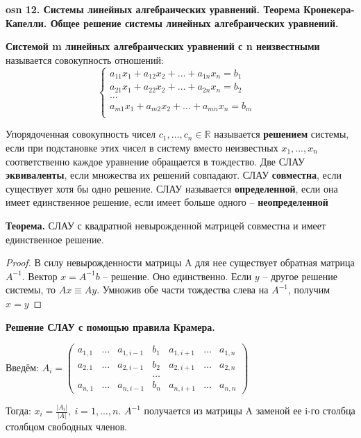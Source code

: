 \setcounter{section}{15}
\setcounter{subsection}{12}
\setcounter{equation}{0}
\textbf{\LARGE osn 12. Системы линейных алгебраических уравнений. Теорема Кронекера-Капелли. Общее решение системы линейных алгебраических уравнений.}

\textbf{Системой m линейных алгебраических уравнений с n неизвестными} называется совокупность отношений:
    $$\begin{cases}
        a_{11}x_1 + a_{12}x_2+\dots+a_{1n}x_n = b_1&\\
        a_{21}x_1 + a_{22}x_2+\dots+a_{2n}x_n = b_2&\\
        \dots&\\
        a_{m1}x_1 + a_{m2}x_2+\dots+a_{mn}x_n = b_m&\\
    \end{cases}$$
    
Упорядоченная совокупность чисел $c_1, ..., c_n \in\mathbb{R}$ называется \textbf{решением} системы, если при подстановке этих чисел в систему вместо неизвестных $x_1, ..., x_n$ соответственно каждое уравнение обращается в тождество.
Две СЛАУ \textbf{эквиваленты}, если множества их решений совпадают.
СЛАУ \textbf{совместна}, если существует хотя бы одно решение.
СЛАУ называется \textbf{определенной}, если она имеет единственное решение, если имеет больше одного -- \textbf{неопределенной}


\textbf{Теорема.} СЛАУ с квадратной невырожденной матрицей совместна и имеет единственное решение.

\begin{proof}
В силу невырожденности матрицы A для нее существует обратная матрица $A^{-1}$.
Вектор $x = A^{-1}b$ -- решение. Оно единственно. Если $y$ -- другое решение системы, то $Ax \equiv Ay$. Умножив обе части тождества слева на $A^{-1}$, получим $x = y$
\end{proof}

\textbf{Решение СЛАУ с помощью правила Крамера.}

Введём:
$A_i = \begin{pmatrix} a_{1,1} & \dots & a_{1,i-1} & b_1 & a_{1,i+1} & \dots & a_{1,n} \\
           a_{2,1} & \dots & a_{2,i-1} & b_2 & a_{2,i+1} & \dots & a_{2,n} \\
            & & & \dots & & & \\
           a_{n,1} & \dots & a_{n,i-1} & b_n & a_{n,i+1} & \dots & a_{n,n}
\end{pmatrix}$

Тогда: $x_i = \frac{|A_i|}{|A|},~i=1,\dots,n$. $A^{-1}$ получается из матрицы A заменой ее i-го столбца столбцом свободных членов.

